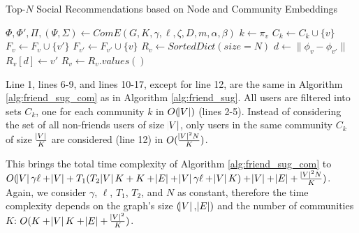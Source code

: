 \documentclass[conference]{IEEEtran}
\begin{document}
\begin{algorithm}
    \caption{Top-$N$ Social Recommendations based on Node and Community Embeddings}
    \label{alg:friend_sug_com}
    \begin{algorithmic}[1]
        \State $\Phi, \Phi', \Pi, (\Psi,\Sigma) \leftarrow ComE(G, K, \gamma, \ell, \zeta, D, m, \alpha, \beta)$
        \State $k \leftarrow \pi_v$
        \State $C_k \leftarrow C_k \cup \{v\}$
        \EndFor
        \State $F_v \leftarrow F_v \cup \{v'\}$
        \State $F_{v'} \leftarrow F_{v'} \cup \{v\}$
        \EndFor
        \State $R_v \leftarrow SortedDict(size=N)$
        \State $d \leftarrow \|\phi_v - \phi_{v'}\|$
        \State $R_v[d] \leftarrow v'$
        \EndFor
        \State $R_v  \leftarrow R_v.values()$
        \EndFor
    \end{algorithmic}
\end{algorithm}

Line 1, lines 6-9, and lines 10-17, except for line 12, are the same in Algorithm \ref{alg:friend_sug_com} as in Algorithm \ref{alg:friend_sug}. All users are filtered into sets $C_k$, one for each community $k$ in $O(\abs{V})$ (lines 2-5). Instead of considering the set of all non-friends users of size $\abs{V}$, only users in the same community $C_k$ of size $\frac{\abs{V}}{K}$ are considered (line 12) in $O(\frac{\abs{V}^2N}{K})$.

This brings the total time complexity of Algorithm \ref{alg:friend_sug_com} to $O(\abs{V}\gamma\ell + \abs{V} + T_1 (T_2\abs{V}K + K + \abs{E} + \abs{V}\gamma\ell + \abs{V}K) + \abs{V} + \abs{E} + \frac{\abs{V}^2N}{K})$. Again, we consider $\gamma$, $\ell$, $T_1$, $T_2$, and $N$ as constant, therefore the time complexity depends on the graph's size $(\abs{V}, \abs{E})$ and the number of communities $K$: $O(K + \abs{V}K + \abs{E} + \frac{\abs{V}^2}{K})$.
\end{document}

